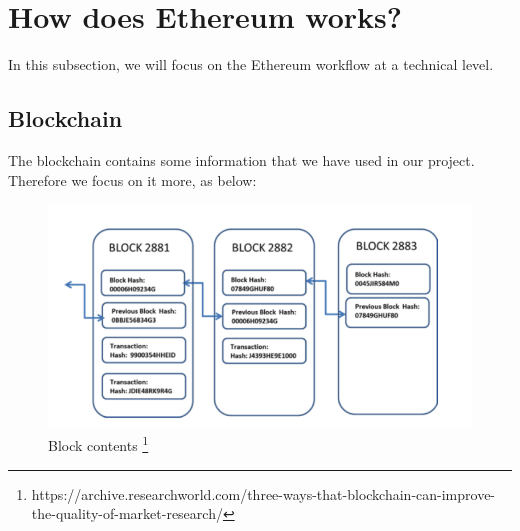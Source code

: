 \section{How does Ethereum works?}
In this subsection, we will focus on the Ethereum workflow at a technical level.
\subsection{Blockchain}
The blockchain contains some information that we have used in our project. Therefore we focus on it more, as below:
\begin{center}
	\begin{figure}[htb!]
		
		\begin{minipage}{0.5\linewidth}
			\centering
			\includegraphics[width=1.95\textwidth]{images/chap01_Blockchain.png}
		\end{minipage}
		\caption[Block contents]{Block contents \footnote{https://archive.researchworld.com/three-ways-that-blockchain-can-improve-the-quality-of-market-research/}}
		
	\end{figure}
	
\end{center}
